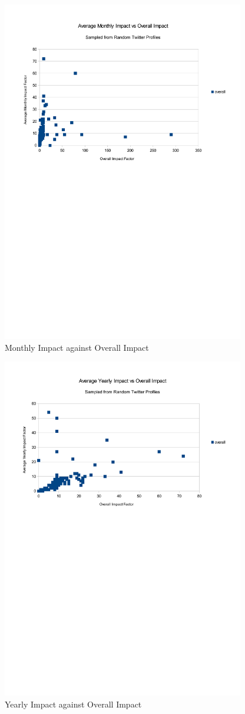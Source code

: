 \begin{figure}[h!]
\centering
\includegraphics[width=400px]{Images/monthly_impact_vs_overallv2.pdf}
\caption{Monthly Impact against Overall Impact}
\end{figure}

\begin{figure}[h!]
\centering
\includegraphics[width=400px]{Images/yearly_impact_vs_overallv2.pdf}
\caption{Yearly Impact against Overall Impact}
\end{figure}

